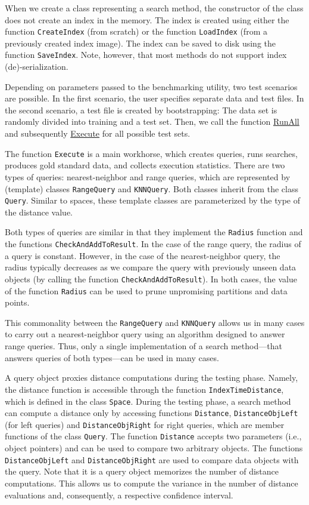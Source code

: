 \documentclass[runningheads,a4paper]{llncs}
\newcommand{\replocfile}{https://github.com/searchivarius/NonMetricSpaceLib/blob/pserv/}
\newcommand{\ttt}[1]{\texttt{#1}}
\begin{document}
When we create a class representing a search method,
the constructor of the class does not create an index in the memory.
The index is created using either the function \ttt{CreateIndex} (from scratch)
or the function \ttt{LoadIndex} (from a previously created index image).
The index can be saved to disk using the function \ttt{SaveIndex}.
Note, however, that most methods do not support index (de)-serialization.

Depending on parameters passed to the benchmarking utility, two test scenarios are possible.
In the first scenario, the user specifies separate data and test files.
In the second scenario, a test file is created by bootstrapping:
The data set is randomly divided into training and a test set.
Then,
we call the function \href{\replocfile similarity_search/include/experiments.h#L70}{RunAll} 
and subsequently \href{\replocfile similarity_search/include/experiments.h#L213}{Execute} for all possible test sets.

The function \ttt{Execute} is a main workhorse, which creates queries, runs searches,
produces gold standard data, and collects execution statistics.
There are two types of queries: nearest-neighbor and range queries,
which are represented by (template) classes \ttt{RangeQuery} and \ttt{KNNQuery}.
Both classes inherit from the class \ttt{Query}.
Similar to spaces, these template classes are parameterized by the type of the distance value.

Both types of queries are similar in that they implement the \ttt{Radius} function
and the functions \ttt{CheckAndAddToResult}. 
In the case of the range query, the radius of a query is constant.
However, in the case of the nearest-neighbor query,
the radius typically decreases as we compare the query
with previously unseen data objects (by calling the function \ttt{CheckAndAddToResult}).
In both cases, the value of the function \ttt{Radius} can be used to prune unpromising
partitions and data points.

This commonality between the \ttt{RangeQuery} and \ttt{KNNQuery}
allows us in many cases to carry out a nearest-neighbor query 
using an algorithm designed to answer range queries.
Thus, only a single implementation of a search method---that answers queries of both types---can be used in many cases.

A query object proxies distance computations during the testing phase.
Namely, the distance function is accessible through the function
\ttt{IndexTimeDistance}, which is defined in the class \ttt{Space}.
During the testing phase, a search method can compute a distance
only by accessing functions \ttt{Distance}, 
\ttt{DistanceObjLeft} (for left queries) and 
\ttt{DistanceObjRight} for right queries,
which are member functions of the class \ttt{Query}.
The function \ttt{Distance} accepts two parameters (i.e., object pointers) and 
can be used to compare two arbitrary objects.
The functions \ttt{DistanceObjLeft} and \ttt{DistanceObjRight} are used 
to compare data objects with the query.
Note that it is a query object  memorizes the number of distance computations.
This allows us to compute the variance in the number of distance evaluations
and, consequently, a respective confidence interval.
\end{document}

